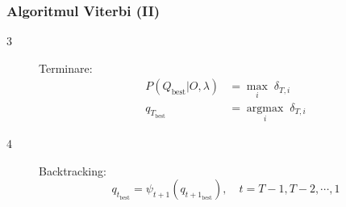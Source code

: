\begin{frame}
  \frametitle{Algoritmul Viterbi (II)}
  \begin{description}
  \item[3] Terminare: \\
    \begin{equation}
      \label{eq:viterbi-termination}
      \begin{split}
        P(Q_{\text{best}} \vert O, \lambda) & = \underset{i}{\operatorname{max}}\; \delta_{T,i} \\
        q_{T_{\text{best}}} & = \underset{i}{\operatorname{argmax}}\; \delta_{T,i}
      \end{split}
    \end{equation}
  \item[4] Backtracking: \\
    \begin{equation}
      \label{eq:viterbi-backtracking}
      q_{t_{\text{best}}} = \psi_{t+1}(q_{t+1_{\text{best}}}), \quad \scriptstyle{t=T-1,T-2,\cdots, 1}
    \end{equation}
  \end{description}
\end{frame}


